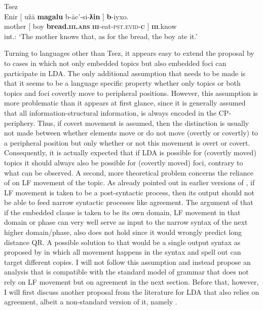 \documentclass[output=paper
,modfonts
,nonflat]{langsci/langscibook}
\begin{document}
\begin{exe}
\ex Tsez \citep[][635]{Polinsky_Potsdam2001}\label{ex:tsez_comp_block_rep}\\
\gll * Enir [ u\v{z}\=a \textbf{magalu} b-\=ac’-si-\textbf{ƛin} ] \textbf{b}-iyxo.\\
{} mother [ boy \textbf{bread.\textsc{\textbf{iii}.abs}} \textsc{\textbf{iii}}-eat-\textsc{pst.evid}-\textsc{\textbf{c}} ]	\textsc{\textbf{iii}}.know\\
\glt int.: `The mother knows that, as for the bread, the boy ate it.'
\end{exe}
Turning to languages other than Tsez, it appears easy to extend the proposal by \citet{Polinsky_Potsdam2001} to cases in which not only embedded topics but also embedded foci can participate in LDA. The only additional assumption that needs to be made is that it seems to be a language specific property whether only topics or both topics and foci covertly move to peripheral positions. However, this assumption is more problematic than it appears at first glance, since it is generally assumed that all information-structural information, is always encoded in the CP-periphery. Thus, if covert movement is assumed, then the distinction is usually not made between whether elements move or do not move (overtly or covertly) to a peripheral position but only whether or not this movement is overt or covert. Consequently, it is actually expected that if LDA is possible for (covertly moved) topics it should always also be possible for (covertly moved) foci, contrary to what can be observed. A second, more theoretical problem concerns the reliance of \citet{Polinsky_Potsdam2001} on LF movement of the topic. As already pointed out in earlier versions of \citet{Bjorkman_Zeijlstra2014}, if LF movement is taken to be a post-syntactic process, then its output should not be able to feed narrow syntactic processes like agreement. The argument of \citet{Preminger_Polinsky2015} that if the embedded clause is taken to be its own domain, LF movement in that domain or phase can very well serve as input to the narrow syntax of the next higher domain/phase, also does not hold since it would wrongly predict long distance QR. A possible solution to that would be a single output syntax as proposed by \citet{Bobaljik2002} in which all movement happens in the syntax and spell out can target different copies. I will not follow this assumption and instead propose an analysis that is compatible with the standard model of grammar that does not rely on LF movement but on agreement in the next section. Before that, however, I will first discuss another proposal from the literature for LDA that also relies on agreement, albeit a non-standard version of it, namely \citet{Bjorkman_Zeijlstra2014}.
\end{document}
